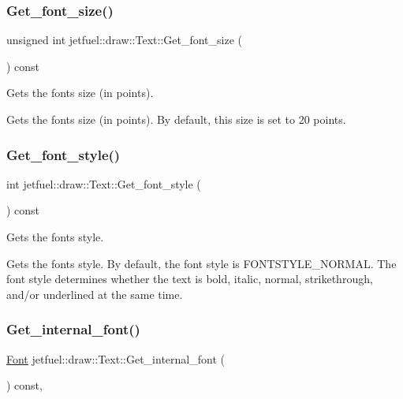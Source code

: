 \subsubsection{\texorpdfstring{Get\+\_\+font\+\_\+size()}{Get\_font\_size()}}
{\footnotesize\ttfamily unsigned int jetfuel\+::draw\+::\+Text\+::\+Get\+\_\+font\+\_\+size (\begin{DoxyParamCaption}{ }\end{DoxyParamCaption}) const\hspace{0.3cm}{\ttfamily [inline]}}



Gets the font\textquotesingle{}s size (in points). 

Gets the font\textquotesingle{}s size (in points). By default, this size is set to 20 points. \mbox{\label{classjetfuel_1_1draw_1_1Text_ade8bf8912e12bfae87a47f15e312f3f0}} 
\subsubsection{\texorpdfstring{Get\+\_\+font\+\_\+style()}{Get\_font\_style()}}
{\footnotesize\ttfamily int jetfuel\+::draw\+::\+Text\+::\+Get\+\_\+font\+\_\+style (\begin{DoxyParamCaption}{ }\end{DoxyParamCaption}) const\hspace{0.3cm}{\ttfamily [inline]}}



Gets the font\textquotesingle{}s style. 

Gets the font\textquotesingle{}s style. By default, the font style is F\+O\+N\+T\+S\+T\+Y\+L\+E\+\_\+\+N\+O\+R\+M\+AL. The font style determines whether the text is bold, italic, normal, strikethrough, and/or underlined at the same time. \mbox{\label{classjetfuel_1_1draw_1_1Text_a32e999790061eb568e3c71e23bee7be0}} 
\subsubsection{\texorpdfstring{Get\+\_\+internal\+\_\+font()}{Get\_internal\_font()}}
{\footnotesize\ttfamily \hyperlink{classjetfuel_1_1draw_1_1Font}{Font} jetfuel\+::draw\+::\+Text\+::\+Get\+\_\+internal\+\_\+font (\begin{DoxyParamCaption}{ }\end{DoxyParamCaption}) const\hspace{0.3cm}{\ttfamily [inline]}, {\ttfamily [protected]}}



